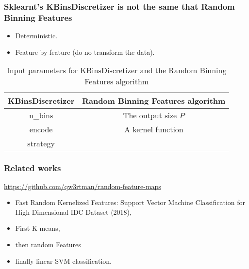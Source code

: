 \begin{frame}
    \frametitle{Sklearnt's KBinsDiscretizer is not the same that Random Binning Features}

    \begin{itemize}
        \item Deterministic.
        \item Feature by feature (do no transform the data).
    \end{itemize}
    \begin{table}[ht]
        \centering
        \caption{Input parameters for KBinsDiscretizer and the Random Binning Features algorithm}
        \label{tab:params}
        \begin{tabular}{c|c}
            \textbf{KBinsDiscretizer} & \textbf{Random Binning Features algorithm} \\
            \hline
            n\_bins & The output size $P$ \\
            encode &  A kernel function\\
            strategy &  \\
    
        \end{tabular}
    \end{table}  
\end{frame}

\begin{frame}
    \frametitle{Related works}

    \cite{exampleRandomBinning}
    \url{https://github.com/qw3rtman/random-feature-maps}
    \begin{itemize}
        \item Fast Random Kernelized Features: Support Vector Machine Classification for High-Dimensional IDC Dataset (2018), 
        \item First K-means,
        \item then random Features
        \item finally linear SVM classification. 
    \end{itemize}
    

\end{frame}

